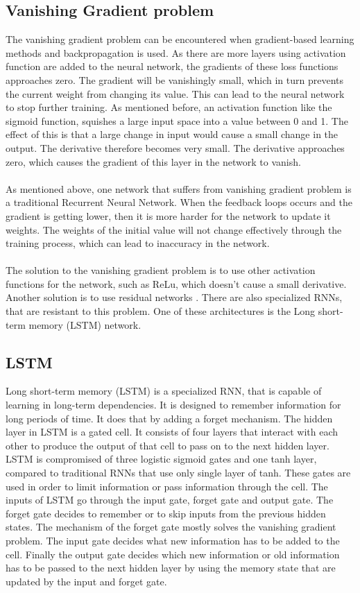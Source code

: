 \subsection{Vanishing Gradient problem}
The vanishing gradient problem can be encountered when gradient-based learning methods and backpropagation is used. As there are more layers using activation function are added to the neural network, the gradients of these loss functions approaches zero. The gradient will be vanishingly small, which in turn prevents the current weight from changing its value. This can lead to the neural network to stop further training. As mentioned before, an activation function like the sigmoid function, squishes a large input space into a value between 0 and 1. The effect of this is that a large change in input would cause a small change in the output. The derivative therefore becomes very small. The derivative approaches zero, which causes the gradient of this layer in the network to vanish.\\\\
As mentioned above, one network that suffers from vanishing gradient problem is a traditional Recurrent Neural Network. When the feedback loops occurs and the gradient is getting lower, then it is more harder for the network to update it weights. The weights of the initial value will not change effectively through the training process, which can lead to inaccuracy in the network. \\\\
The solution to the vanishing gradient problem is to use other activation functions for the network, such as ReLu, which doesn't cause a small derivative. Another solution is to use residual networks \cite{DBLP:journals/corr/HeZRS15}. There are also specialized RNNs, that are resistant to this problem. One of these architectures is the Long short-term memory (LSTM) network. 

\subsection{LSTM}
Long short-term memory (LSTM) is a specialized RNN, that is capable of learning in long-term dependencies. It is designed to remember information for long periods of time. It does that by adding a forget mechanism. The hidden layer in LSTM is a gated cell. It consists of four layers that interact with each other to produce the output of that cell to pass on to the next hidden layer. LSTM is compromised of three logistic sigmoid gates and one tanh layer, compared to traditional RNNs that use only single layer of tanh. These gates are used in order to limit information or pass information through the cell. The inputs of LSTM go through the input gate, forget gate and output gate. The forget gate decides to remember or to skip inputs from the previous hidden states. The mechanism of the forget gate mostly solves the vanishing gradient problem. The input gate decides what new information has to be added to the cell. Finally the output gate decides which new information or old information has to be passed to the next hidden layer by using the memory state that are updated by the input and forget gate.\\

